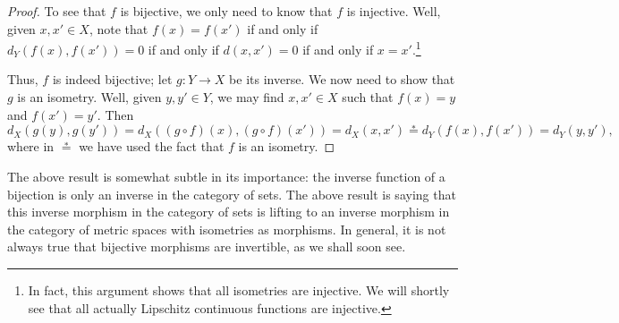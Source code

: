 \documentclass[../notes.tex]{subfiles}
\begin{document}
\begin{proof}
	To see that $f$ is bijective, we only need to know that $f$ is injective. Well, given $x,x'\in X$, note that $f(x)=f(x')$ if and only if $d_Y(f(x),f(x'))=0$ if and only if $d(x,x')=0$ if and only if $x=x'$.\footnote{In fact, this argument shows that all isometries are injective. We will shortly see that all actually Lipschitz continuous functions are injective.}

	Thus, $f$ is indeed bijective; let $g\colon Y\to X$ be its inverse. We now need to show that $g$ is an isometry. Well, given $y,y'\in Y$, we may find $x,x'\in X$ such that $f(x)=y$ and $f(x')=y'$. Then
	\[d_X(g(y),g(y'))=d_X((g\circ f)(x),(g\circ f)(x'))=d_X(x,x')\stackrel*=d_Y(f(x),f(x'))=d_Y(y,y'),\]
	where in $\stackrel*=$ we have used the fact that $f$ is an isometry.
\end{proof}
\begin{remark} \label{rem:bijvsiso}
	The above result is somewhat subtle in its importance: the inverse function of a bijection is only an inverse in the category of sets. The above result is saying that this inverse morphism in the category of sets is lifting to an inverse morphism in the category of metric spaces with isometries as morphisms. In general, it is not always true that bijective morphisms are invertible, as we shall soon see.
\end{remark}
\end{document}
